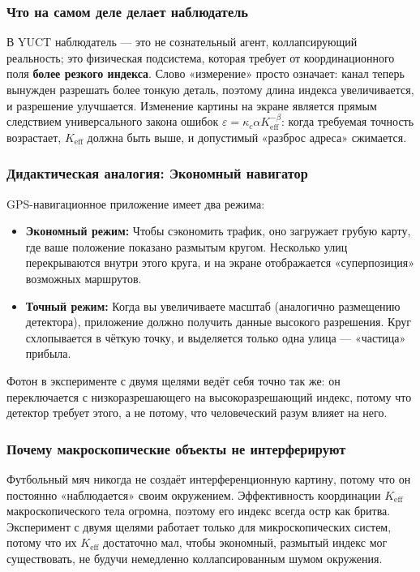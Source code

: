 \documentclass[12pt,a4paper]{article}
\theoremstyle{remark}
\begin{document}
	\subsubsection{Что на самом деле делает наблюдатель}
	
	В YUCT наблюдатель — это не сознательный агент, коллапсирующий реальность; это физическая подсистема, которая требует от координационного поля \textbf{более резкого индекса}. Слово «измерение» просто означает: канал теперь вынужден разрешать более тонкую деталь, поэтому длина индекса увеличивается, и разрешение улучшается. Изменение картины на экране является прямым следствием универсального закона ошибок $\varepsilon = \kappa_c \alpha K_{\mathrm{eff}}^{-\beta}$: когда требуемая точность возрастает, $K_{\mathrm{eff}}$ должна быть выше, и допустимый «разброс адреса» сжимается.
	
	\subsubsection{Дидактическая аналогия: Экономный навигатор}
	
	GPS-навигационное приложение имеет два режима:
	\begin{itemize}
		\item \textbf{Экономный режим:} Чтобы сэкономить трафик, оно загружает грубую карту, где ваше положение показано размытым кругом. Несколько улиц перекрываются внутри этого круга, и на экране отображается «суперпозиция» возможных маршрутов.
		\item \textbf{Точный режим:} Когда вы увеличиваете масштаб (аналогично размещению детектора), приложение должно получить данные высокого разрешения. Круг схлопывается в чёткую точку, и выделяется только одна улица — «частица» прибыла.
	\end{itemize}
	Фотон в эксперименте с двумя щелями ведёт себя точно так же: он переключается с низкоразрешающего на высокоразрешающий индекс, потому что детектор требует этого, а не потому, что человеческий разум влияет на него.
	
	\subsubsection{Почему макроскопические объекты не интерферируют}
	
	Футбольный мяч никогда не создаёт интерференционную картину, потому что он постоянно «наблюдается» своим окружением. Эффективность координации $K_{\mathrm{eff}}$ макроскопического тела огромна, поэтому его индекс всегда остр как бритва. Эксперимент с двумя щелями работает только для микроскопических систем, потому что их $K_{\mathrm{eff}}$ достаточно мал, чтобы экономный, размытый индекс мог существовать, не будучи немедленно коллапсированным шумом окружения.
	
\end{document}
